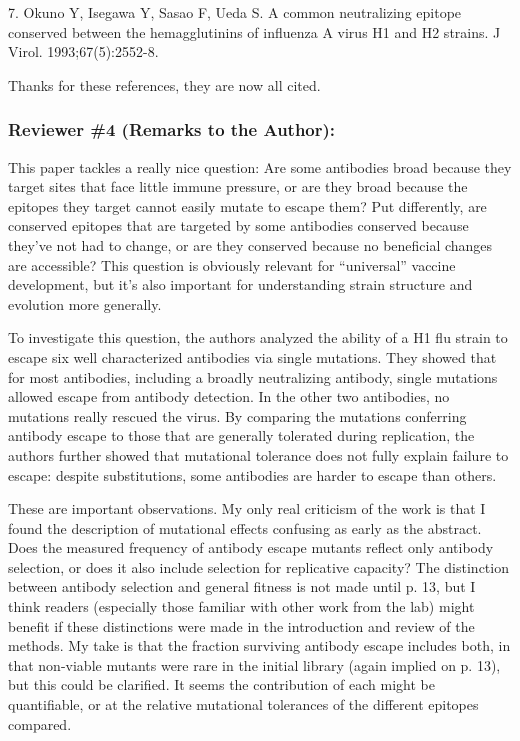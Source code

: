 \documentclass[11pt, oneside]{article}   	%
\begin{document}
7.  Okuno Y, Isegawa Y, Sasao F, Ueda S. A common neutralizing epitope conserved between the hemagglutinins of influenza A virus H1 and H2 strains. J Virol. 1993;67(5):2552-8.

{\color{black}
Thanks for these references, they are now all cited.
}


\subsubsection*{Reviewer \#4 (Remarks to the Author):}

This paper tackles a really nice question: Are some antibodies broad because they target sites that face little immune pressure, or are they broad because the epitopes they target cannot easily mutate to escape them? Put differently, are conserved epitopes that are targeted by some antibodies conserved because they've not had to change, or are they conserved because no beneficial changes are accessible? This question is obviously relevant for ``universal'' vaccine development, but it's also important for understanding strain structure and evolution more generally.

To investigate this question, the authors analyzed the ability of a H1 flu strain to escape six well characterized antibodies via single mutations. They showed that for most antibodies, including a broadly neutralizing antibody, single mutations allowed escape from antibody detection. In the other two antibodies, no mutations really rescued the virus. By comparing the mutations conferring antibody escape to those that are generally tolerated during replication, the authors further showed that mutational tolerance does not fully explain failure to escape: despite substitutions, some antibodies are harder to escape than others. 

These are important observations. My only real criticism of the work is that I found the description of mutational effects confusing as early as the abstract. Does the measured frequency of antibody escape mutants reflect only antibody selection, or does it also include selection for replicative capacity? The distinction between antibody selection and general fitness is not made until p. 13, but I think readers (especially those familiar with other work from the lab) might benefit if these distinctions were made in the introduction and review of the methods. My take is that the fraction surviving antibody escape includes both, in that non-viable mutants were rare in the initial library (again implied on p. 13), but this could be clarified. It seems the contribution of each might be quantifiable, or at the relative mutational tolerances of the different epitopes compared. 
\end{document}
